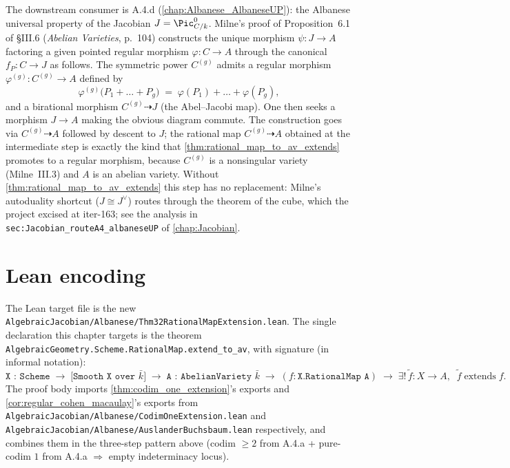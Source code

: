 The downstream consumer is A.4.d (\cref{chap:Albanese_AlbaneseUP}):
the Albanese universal property of the Jacobian \(J = \Pic^0_{C/k}\). Milne's proof of
Proposition~6.1 of \S III.6 (\emph{Abelian Varieties}, p.~104) constructs the unique
morphism \(\psi \colon J \to A\) factoring a given pointed regular morphism
\(\varphi \colon C \to A\) through the canonical \(f_P \colon C \to J\) as follows. The
symmetric power \(C^{(g)}\) admits a regular morphism \(\varphi^{(g)} \colon C^{(g)} \to A\)
defined by
\[
  \varphi^{(g)}\bigl(P_1 + \dots + P_g\bigr) \;=\; \varphi(P_1) + \dots + \varphi(P_g),
\]
and a birational morphism \(C^{(g)} \dashrightarrow J\) (the Abel--Jacobi map). One then
seeks a morphism \(J \to A\) making the obvious diagram commute. The construction goes via
\(C^{(g)} \dashrightarrow A\) followed by descent to \(J\); the rational map
\(C^{(g)} \dashrightarrow A\) obtained at the intermediate step is exactly the kind that
\cref{thm:rational_map_to_av_extends} promotes to a regular morphism, because \(C^{(g)}\) is
a nonsingular variety (Milne~III.3) and \(A\) is an abelian variety. Without
\cref{thm:rational_map_to_av_extends} this step has no replacement: Milne's autoduality
shortcut (\(J \cong J^\vee\)) routes through the theorem of the cube, which the project
excised at iter-163; see the analysis in \texttt{sec:Jacobian_routeA4_albaneseUP} of
\cref{chap:Jacobian}.

\section{Lean encoding}
\label{sec:thm32_lean_encoding}

The Lean target file is the new
\texttt{AlgebraicJacobian/Albanese/Thm32RationalMapExtension.lean}. The single declaration
this chapter targets is the theorem
\texttt{AlgebraicGeometry.Scheme.RationalMap.extend\_to\_av}, with signature (in informal
notation):
\[
  \texttt{X : Scheme} \;\to\; \texttt{[Smooth X over \(\bar k\)]} \;\to\;
  \texttt{A : AbelianVariety \(\bar k\)} \;\to\;
  (f : \texttt{X.RationalMap A}) \;\to\;
  \exists ! \, \widetilde f \colon X \to A, \;\; \widetilde f \;\text{extends}\; f.
\]
The proof body imports \cref{thm:codim_one_extension}'s exports and
\cref{cor:regular_cohen_macaulay}'s exports from
\texttt{AlgebraicJacobian/Albanese/CodimOneExtension.lean} and
\texttt{AlgebraicJacobian/Albanese/AuslanderBuchsbaum.lean} respectively, and combines them
in the three-step pattern above (codim \(\geq 2\) from A.4.a + pure-codim \(1\) from A.4.a
\(\Rightarrow\) empty indeterminacy locus).

